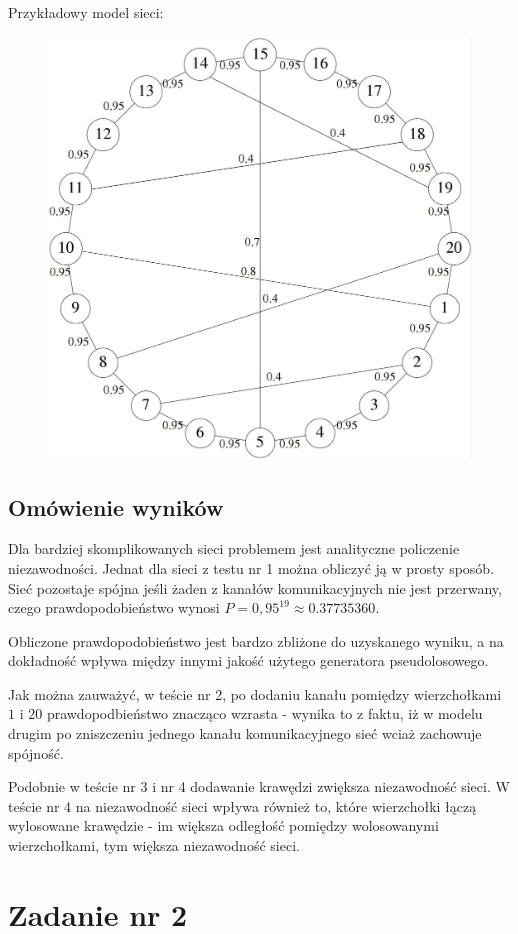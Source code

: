 \documentclass[titlepage]{article}
\begin{document}
\noindent Przykładowy model sieci:
\begin{figure}[h!]
	\centering
	\includegraphics[width=0.8\linewidth]{graph4.jpg}
\end{figure}

\newpage
\subsection{Omówienie wyników}
Dla bardziej skomplikowanych sieci problemem jest analityczne policzenie niezawodności. Jednat dla sieci z testu nr 1 można obliczyć ją w prosty sposób. Sieć pozostaje spójna jeśli żaden z kanałów komunikacyjnych nie jest przerwany, czego prawdopodobieństwo wynosi $P = 0,95^{19} \approx 0.37735360$.

Obliczone prawdopodobieństwo jest bardzo zbliżone do uzyskanego wyniku, a na dokładność wpływa między innymi jakość użytego generatora pseudolosowego.

Jak można zauważyć, w teście nr 2, po dodaniu kanału pomiędzy wierzchołkami $1$ i $20$ prawdopodbieństwo znacząco wzrasta - wynika to z faktu, iż w modelu drugim po zniszczeniu jednego kanału komunikacyjnego sieć wciaż zachowuje spójność.

Podobnie w teście nr 3 i nr 4 dodawanie krawędzi zwiększa niezawodność sieci. W teście nr 4 na niezawodność sieci wpływa również to, które wierzchołki łączą wylosowane krawędzie - im większa odległość pomiędzy wolosowanymi wierzchołkami, tym większa niezawodność sieci.

\newpage
\section{Zadanie nr 2}
\end{document}
